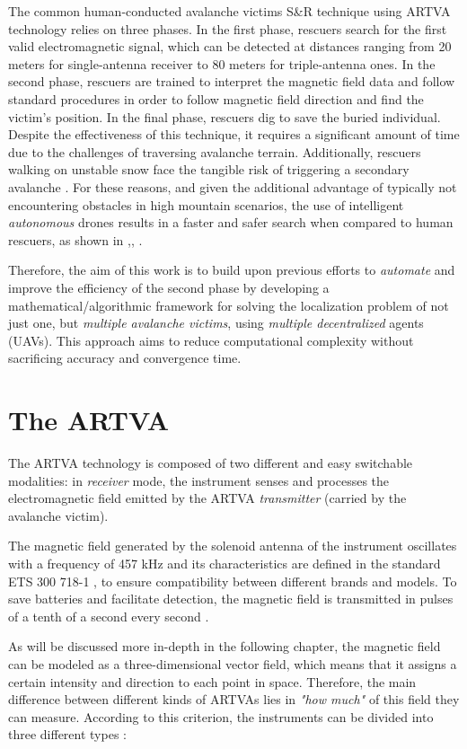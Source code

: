 The common human-conducted avalanche victims S\&R technique using ARTVA technology relies on three phases. In the first phase, rescuers search for the first valid electromagnetic signal, which can be detected at distances ranging from 20 meters for single-antenna receiver to 80 meters for triple-antenna ones. In the second phase, rescuers are trained to interpret the magnetic field data and follow standard procedures in order to follow magnetic field direction and find the victim's position. In the final phase, rescuers dig to save the buried individual.
Despite the effectiveness of this technique, it requires a significant amount of time due to the challenges of traversing avalanche terrain. Additionally, rescuers walking on unstable snow face the tangible risk of triggering a secondary avalanche \cite{first-model}. For these reasons, and given the additional advantage of typically not encountering obstacles in high mountain scenarios, the use of intelligent \textit{autonomous} drones results in a faster and safer search when compared to human rescuers, as shown in \cite{sr},\cite{sr2}, \cite{sr3}.

Therefore, the aim of this work is to build upon previous efforts to \textit{automate} and improve the efficiency of the second phase by developing a mathematical/algorithmic framework for solving the localization problem of not just one, but \textit{multiple avalanche victims}, using \textit{multiple decentralized} agents (UAVs). This approach aims to reduce computational complexity without sacrificing accuracy and convergence time.


\section{The ARTVA}
The ARTVA technology is composed of two different and easy switchable modalities: in \textit{receiver} mode, the instrument senses and processes the electromagnetic field emitted by the ARTVA \textit{transmitter} (carried by the avalanche victim).

The magnetic field generated by the solenoid antenna of the instrument oscillates with a frequency of 457 kHz and its characteristics are defined in the standard ETS 300 718-1 \cite{eu_standard}, to ensure compatibility between different brands and models. To save batteries and facilitate detection, the magnetic field is transmitted in pulses of a tenth of a second every second \cite{first-model}.

As will be discussed more in-depth in the following chapter, the magnetic field can be modeled as a three-dimensional vector field, which means that it assigns a certain intensity and direction to each point in space. Therefore, the main difference between different kinds of ARTVAs lies in \textit{"how much"} of this field they can measure. According to this criterion, the instruments can be divided into three different types \cite{first-model}:

